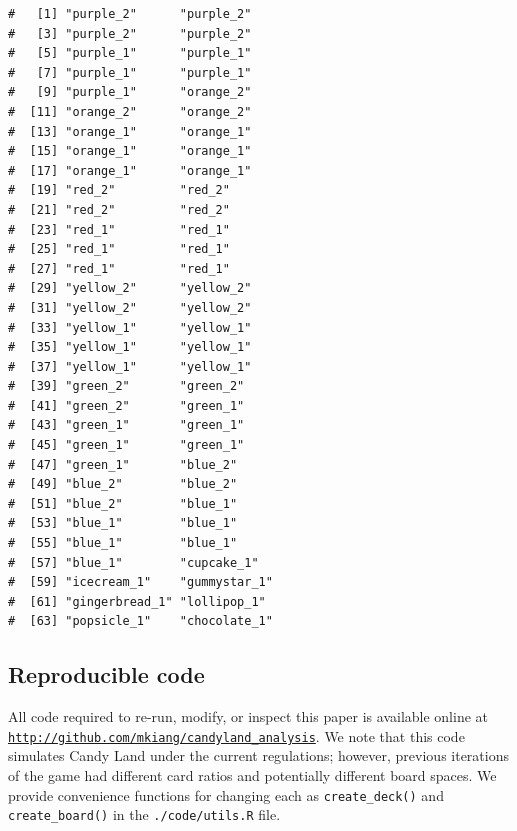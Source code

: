 \documentclass[letterpaper,9pt,twocolumn,twoside,]{pinp}
\begin{document}
\begin{ShadedResult}
\begin{verbatim}
#   [1] "purple_2"      "purple_2"     
#   [3] "purple_2"      "purple_2"     
#   [5] "purple_1"      "purple_1"     
#   [7] "purple_1"      "purple_1"     
#   [9] "purple_1"      "orange_2"     
#  [11] "orange_2"      "orange_2"     
#  [13] "orange_1"      "orange_1"     
#  [15] "orange_1"      "orange_1"     
#  [17] "orange_1"      "orange_1"     
#  [19] "red_2"         "red_2"        
#  [21] "red_2"         "red_2"        
#  [23] "red_1"         "red_1"        
#  [25] "red_1"         "red_1"        
#  [27] "red_1"         "red_1"        
#  [29] "yellow_2"      "yellow_2"     
#  [31] "yellow_2"      "yellow_2"     
#  [33] "yellow_1"      "yellow_1"     
#  [35] "yellow_1"      "yellow_1"     
#  [37] "yellow_1"      "yellow_1"     
#  [39] "green_2"       "green_2"      
#  [41] "green_2"       "green_1"      
#  [43] "green_1"       "green_1"      
#  [45] "green_1"       "green_1"      
#  [47] "green_1"       "blue_2"       
#  [49] "blue_2"        "blue_2"       
#  [51] "blue_2"        "blue_1"       
#  [53] "blue_1"        "blue_1"       
#  [55] "blue_1"        "blue_1"       
#  [57] "blue_1"        "cupcake_1"    
#  [59] "icecream_1"    "gummystar_1"  
#  [61] "gingerbread_1" "lollipop_1"   
#  [63] "popsicle_1"    "chocolate_1"
\end{verbatim}
\end{ShadedResult}

\hypertarget{reproducible-code}{%
\subsection{Reproducible code}\label{reproducible-code}}

All code required to re-run, modify, or inspect this paper is available
online at
\href{http://github.com/mkiang/candyland_analysis}{\texttt{http://github.com/mkiang/candyland\_analysis}}.
We note that this code simulates Candy Land under the current
regulations; however, previous iterations of the game had different card
ratios and potentially different board spaces. We provide convenience
functions for changing each as \texttt{create\_deck()} and
\texttt{create\_board()} in the \texttt{./code/utils.R} file.
\end{document}

